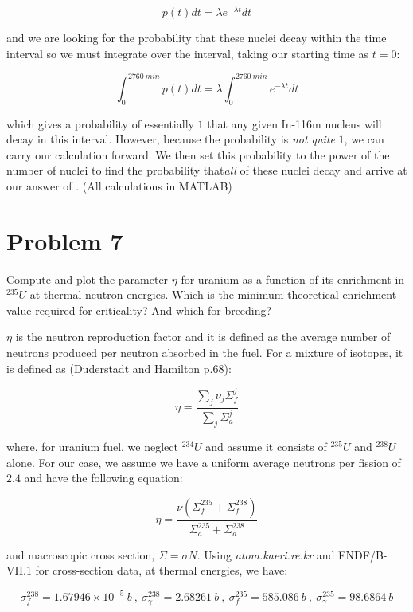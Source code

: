 \documentclass{article}
\begin{document}
$$p(t)dt = \lambda e^{-\lambda t} dt$$

and we are looking for the probability that these nuclei decay within the time interval so we must integrate over the interval, taking our starting time as $t = 0$:

$$\int_{0}^{2760~min} p(t) dt = \lambda \int_{0}^{2760~min} e^{- \lambda t} dt$$

which gives a probability of essentially $1$ that any given In-116m nucleus will decay in this interval. However, because the probability is \textit{not quite} $1$, we can carry our calculation forward. We then set this probability to the power of the number of nuclei to find the probability that\textit{all} of these nuclei decay and arrive at our answer of . (All calculations in MATLAB)

\hrulefill


\section*{Problem 7}

Compute and plot the parameter $\eta$ for uranium as a function of its enrichment in $^{235}U$ at
thermal neutron energies. Which is the minimum theoretical enrichment value required for
criticality? And which for breeding?

\hrulefill

$\eta$ is the neutron reproduction factor and it is defined as the average number of neutrons produced per neutron absorbed in the fuel. For a mixture of isotopes, it is defined as (Duderstadt and Hamilton p.68):

$$\eta = \frac{\sum_{j} \nu_{j}\Sigma_{f}^{j}}{\sum_{j} \Sigma_{a}^{j}}$$

where, for uranium fuel, we neglect $^{234}U$ and assume it consists of $^{235}U$ and $^{238}U$ alone. For our case, we assume we have a uniform average neutrons per fission of $2.4$ and have the following equation:

$$\eta = \frac{\nu (\Sigma_{f}^{235} + \Sigma_{f}^{238})}{\Sigma_{a}^{235} + \Sigma_{a}^{238}}$$

and macroscopic cross section, $\Sigma = \sigma N$. Using \textit{atom.kaeri.re.kr} and ENDF/B-VII.1 for cross-section data, at thermal energies, we have:

$$\sigma_{f}^{238} = 1.67946 \times 10^{-5}~b~,~\sigma_{\gamma}^{238} = 2.68261~b~,~\sigma_{f}^{235} = 585.086~b~,~\sigma_{\gamma}^{235} = 98.6864~b$$
\end{document}
